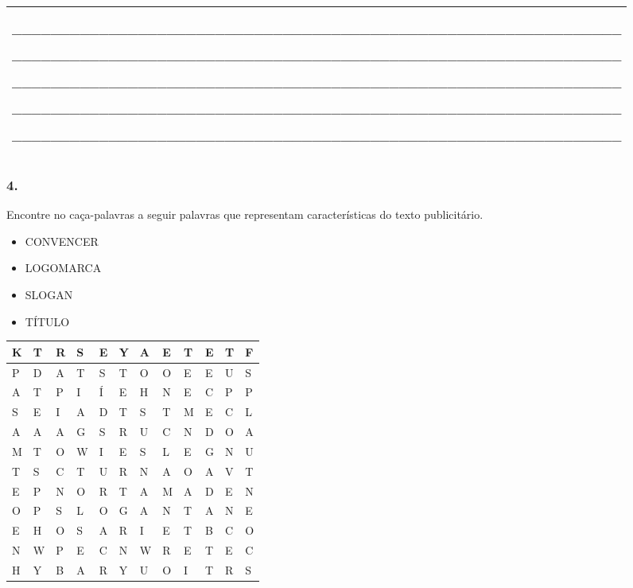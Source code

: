 \begin{longtable}[]{@{}l@{}}
\toprule
\begin{minipage}[t]{0.97\columnwidth}\raggedright\strut
\_\_\_\_\_\_\_\_\_\_\_\_\_\_\_\_\_\_\_\_\_\_\_\_\_\_\_\_\_\_\_\_\_\_\_\_\_\_\_\_\_\_\_\_\_\_\_\_\_\_\_\_\_\_\_\_\_\_\_\_\_\_\_

\_\_\_\_\_\_\_\_\_\_\_\_\_\_\_\_\_\_\_\_\_\_\_\_\_\_\_\_\_\_\_\_\_\_\_\_\_\_\_\_\_\_\_\_\_\_\_\_\_\_\_\_\_\_\_\_\_\_\_\_\_\_\_

\_\_\_\_\_\_\_\_\_\_\_\_\_\_\_\_\_\_\_\_\_\_\_\_\_\_\_\_\_\_\_\_\_\_\_\_\_\_\_\_\_\_\_\_\_\_\_\_\_\_\_\_\_\_\_\_\_\_\_\_\_\_\_

\_\_\_\_\_\_\_\_\_\_\_\_\_\_\_\_\_\_\_\_\_\_\_\_\_\_\_\_\_\_\_\_\_\_\_\_\_\_\_\_\_\_\_\_\_\_\_\_\_\_\_\_\_\_\_\_\_\_\_\_\_\_\_

\_\_\_\_\_\_\_\_\_\_\_\_\_\_\_\_\_\_\_\_\_\_\_\_\_\_\_\_\_\_\_\_\_\_\_\_\_\_\_\_\_\_\_\_\_\_\_\_\_\_\_\_\_\_\_\_\_\_\_\_\_\_\_\strut
\end{minipage}\tabularnewline
\bottomrule
\end{longtable}

\subsubsection{4.}\label{section-42}

Encontre no caça-palavras a seguir palavras que representam
características do texto publicitário.

\begin{itemize}
\item
  CONVENCER
\item
  LOGOMARCA
\item
  SLOGAN
\item
  TÍTULO
\end{itemize}

\begin{longtable}[]{@{}llllllllllll@{}}
\toprule
K & T & R & S & E & Y & A & E & T & E & T & F\tabularnewline
\midrule
\endhead
P & D & A & T & S & T & O & O & E & E & U & S\tabularnewline
A & T & P & I & Í & E & H & N & E & C & P & P\tabularnewline
S & E & I & A & D & T & S & T & M & E & C & L\tabularnewline
A & A & A & G & S & R & U & C & N & D & O & A\tabularnewline
M & T & O & W & I & E & S & L & E & G & N & U\tabularnewline
T & S & C & T & U & R & N & A & O & A & V & T\tabularnewline
E & P & N & O & R & T & A & M & A & D & E & N\tabularnewline
O & P & S & L & O & G & A & N & T & A & N & E\tabularnewline
E & H & O & S & A & R & I & E & T & B & C & O\tabularnewline
N & W & P & E & C & N & W & R & E & T & E & C\tabularnewline
H & Y & B & A & R & Y & U & O & I & T & R & S\tabularnewline
\bottomrule
\end{longtable}


